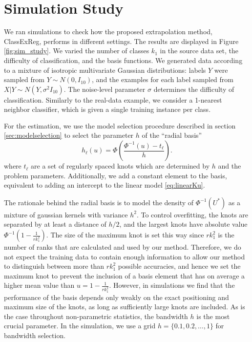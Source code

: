 \documentclass[twoside,11pt]{article}
\begin{document}
\section{Simulation Study}\label{sec:simulation_study}

We ran simulations to check how the proposed extrapolation method, ClassExReg,
performs in different settings.  The results are displayed in Figure
\ref{fig:sim_study}. 
We varied the number of classes $k_1$ in the
source data set, the difficulty of classification, and the basis
functions. We generated data according to a mixture of isotropic
multivariate Gaussian distributions: labels $Y$ were sampled from $Y
\sim N(0, I_{10})$, and the examples for each label sampled from $X|Y
\sim N(Y, \sigma^2 I_{10})$. The noise-level parameter $\sigma$
determines the difficulty of classification. Similarly to the
real-data example, we consider a 1-nearest neighbor classifier, which
is given a single training instance per class.

For the estimation, we use the model selection procedure described
in section \ref{sec:modelselection} to select the parameter $h$ of the
``radial basis''
\[
h_\ell(u) = \Phi\left(\frac{\Phi^{-1}(u) - t_\ell}{h}\right).
\]
where $t_\ell$ are a set of regularly spaced knots which are
determined by $h$ and the problem parameters. Additionally, we add a
constant element to the basis, equivalent to adding an intercept to
the linear model \eqref{eq:linearKu}. 

The rationale behind the radial basis is to model the density of
$\Phi^{-1}(U^*)$ as a mixture of gaussian kernels with variance $h^2$.
To control overfitting, the knots are separated by at least a distance
of $h/2$, and the largest knots have absolute value $\Phi^{-1}(1 -
\frac{1}{rk_1^2}).$ The size of the maximum knot is set this way since
$rk_1^2$ is the number of ranks that are calculated and used by our
method.  Therefore, we do not expect the training data to contain
enough information to allow our method to distinguish between more
than $rk_1^2$ possible accuracies, and hence we set the maximum knot
to prevent the inclusion of a basis element that has on average a
higher mean value than $u = 1-\frac{1}{rk_1^2}$.  However, in
simulations we find that the performance of the basis depends only
weakly on the exact positioning and maximum size of the knots, as long
as sufficiently large knots are included. As is the case throughout non-parametric statistics, the bandwidth $h$ is the
most crucial parameter.  In the simulation, we use a grid $h = \{0.1,
0.2, \hdots, 1\}$ for bandwidth selection.
\end{document}
